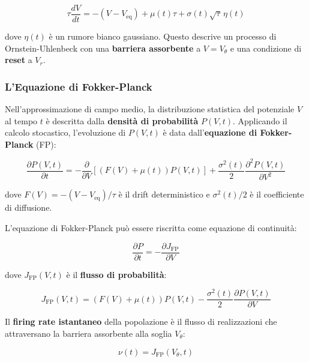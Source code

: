 \begin{equation}
\tau \frac{dV}{dt} = -(V - V_{\text{eq}}) + \mu(t)\tau + \sigma(t)\sqrt{\tau}\,\eta(t)
\end{equation}

dove $\eta(t)$ è un rumore bianco gaussiano. Questo descrive un processo di Ornstein-Uhlenbeck con una \textbf{barriera assorbente} a $V = V_\theta$ e una condizione di \textbf{reset} a $V_r$.

\subsubsection{L'Equazione di Fokker-Planck}

Nell'approssimazione di campo medio, la distribuzione statistica del potenziale $V$ al tempo $t$ è descritta dalla \textbf{densità di probabilità} $P(V, t)$. Applicando il calcolo stocastico, l'evoluzione di $P(V,t)$ è data dall'\textbf{equazione di Fokker-Planck} (FP):

\begin{equation}
\frac{\partial P(V,t)}{\partial t} = -\frac{\partial}{\partial V}\!\left[\left(F(V) + \mu(t)\right) P(V,t)\right] + \frac{\sigma^2(t)}{2}\frac{\partial^2 P(V,t)}{\partial V^2}
\end{equation}

dove $F(V) = -(V - V_{\text{eq}})/\tau$ è il drift deterministico e $\sigma^2(t)/2$ è il coefficiente di diffusione. 


L'equazione di Fokker-Planck può essere riscritta come equazione di continuità:

\begin{equation}
\frac{\partial P}{\partial t} = -\frac{\partial J_{\text{FP}}}{\partial V}
\end{equation}

dove $J_{\text{FP}}(V, t)$ è il \textbf{flusso di probabilità}:

\begin{equation}
J_{\text{FP}}(V, t) = \left(F(V) + \mu(t)\right) P(V, t) - \frac{\sigma^2(t)}{2}\frac{\partial P(V,t)}{\partial V}
\end{equation}

Il \textbf{firing rate istantaneo} della popolazione è il flusso di realizzazioni che attraversano la barriera assorbente alla soglia $V_\theta$:

\begin{equation}
\nu(t) = J_{\text{FP}}(V_\theta, t)
\end{equation}

